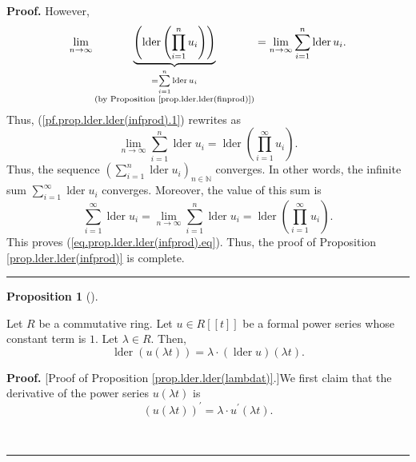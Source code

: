 \documentclass[numbers=enddot,12pt,final,onecolumn,notitlepage]{scrartcl}%
\theoremstyle{definition}
\newtheorem{prop}[theo]{Proposition}
\newenvironment{proposition}[1][]
{\begin{prop}[#1]\begin{leftbar}}
{\end{leftbar}\end{prop}}
\newenvironment{proof}[1][Proof]{\noindent\textbf{#1.} }{\ \rule{0.5em}{0.5em}}
\let\sumnonlimits\sum
\let\prodnonlimits\prod
\renewcommand{\sum}{\sumnonlimits\limits}
\renewcommand{\prod}{\prodnonlimits\limits}
\newenvironment{verlong}{}{}
\begin{document}
\begin{verlong}
\begin{proof}
However,
\[
\lim\limits_{n\rightarrow\infty}\underbrace{\left(  \operatorname*{lder}%
\left(  \prod_{i=1}^{n}u_{i}\right)  \right)  }_{\substack{=\sum_{i=1}%
^{n}\operatorname*{lder}u_{i}\\\text{(by Proposition
\ref{prop.lder.lder(finprod)})}}}=\lim\limits_{n\rightarrow\infty}\sum
_{i=1}^{n}\operatorname*{lder}u_{i}.
\]
Thus, (\ref{pf.prop.lder.lder(infprod).1}) rewrites as
\[
\lim\limits_{n\rightarrow\infty}\sum_{i=1}^{n}\operatorname*{lder}%
u_{i}=\operatorname*{lder}\left(  \prod_{i=1}^{\infty}u_{i}\right)  .
\]
Thus, the sequence $\left(  \sum_{i=1}^{n}\operatorname*{lder}u_{i}\right)
_{n\in\mathbb{N}}$ converges. In other words, the infinite sum $\sum
_{i=1}^{\infty}\operatorname*{lder}u_{i}$ converges. Moreover, the value of
this sum is
\[
\sum_{i=1}^{\infty}\operatorname*{lder}u_{i}=\lim\limits_{n\rightarrow\infty
}\sum_{i=1}^{n}\operatorname*{lder}u_{i}=\operatorname*{lder}\left(
\prod_{i=1}^{\infty}u_{i}\right)  .
\]
This proves (\ref{eq.prop.lder.lder(infprod).eq}). Thus, the proof of
Proposition \ref{prop.lder.lder(infprod)} is complete.
\end{proof}

\begin{proposition}
\label{prop.lder.lder(lambdat)}Let $R$ be a commutative ring. Let $u\in
R\left[  \left[  t\right]  \right]  $ be a formal power series whose constant
term is $1$. Let $\lambda\in R$. Then,%
\[
\operatorname*{lder}\left(  u\left(  \lambda t\right)  \right)  =\lambda
\cdot\left(  \operatorname*{lder}u\right)  \left(  \lambda t\right)  .
\]

\end{proposition}

\begin{proof}
[Proof of Proposition \ref{prop.lder.lder(lambdat)}.]We first claim that the
derivative of the power series $u\left(  \lambda t\right)  $ is%
\begin{equation}
\left(  u\left(  \lambda t\right)  \right)  ^{\prime}=\lambda\cdot u^{\prime
}\left(  \lambda t\right)  . \label{pf.prop.lder.lder(lambdat).1}%
\end{equation}



\end{proof}
\end{verlong}
\end{document}
